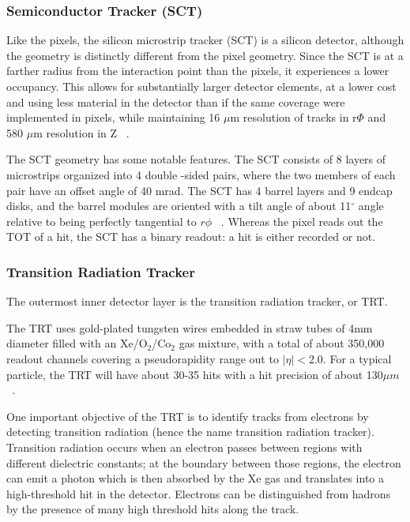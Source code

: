 \subsubsection{Semiconductor Tracker (SCT)}
\label{sec:sct}
Like the pixels, the silicon microstrip tracker (SCT) is a silicon detector, although the geometry is 
distinctly different from the pixel geometry.  Since the SCT is at a farther radius from the interaction point than 
the pixels, it experiences a lower occupancy.  This allows for substantially larger detector elements, at a lower 
cost and using less material in the detector than if the same coverage were implemented in pixels, while maintaining 
16 $\mu$m resolution of tracks in r$\Phi$ and 580 $\mu$m resolution in Z ~\cite{sct_res}.   

The SCT geometry has some notable features.  The SCT consists of 8 layers of microstrips organized into 4 double
-sided pairs, where the two members of each pair have an offset angle of 40 mrad.  The 
SCT has 4 barrel layers and 9 endcap disks, and the barrel modules are oriented with a tilt angle 
of about 11$^\circ$ angle relative to being perfectly tangential to $r\phi$ ~\cite{tdr}.  Whereas the 
pixel reads out the TOT of a hit, the SCT has a binary readout: a hit is either recorded or not.



\subsubsection{Transition Radiation Tracker}
\label{sec:trt}
The outermost inner detector layer is the transition radiation tracker, or TRT.  

The TRT uses gold-plated tungsten wires embedded in straw tubes of 4mm diameter filled with an Xe/O$_2$/Co$_2$ 
gas mixture, with a total of about 350,000 readout channels covering a pseudorapidity range out to $|\eta|<$2.0.
  For a typical particle, the TRT will have about 30-35 hits with a hit precision of about 130$\mu m$ ~\cite{trt}.

One important objective of the TRT is to identify tracks from electrons by detecting transition radiation (hence the name 
transition radiation tracker).  Transition radiation occurs when an electron passes between regions with different 
dielectric constants; at the boundary between those regions, the electron can emit a photon which is then absorbed 
by the Xe gas and translates into a high-threshold hit in the detector.  Electrons can be distinguished 
from hadrons by the presence of many high threshold hits along the track.

